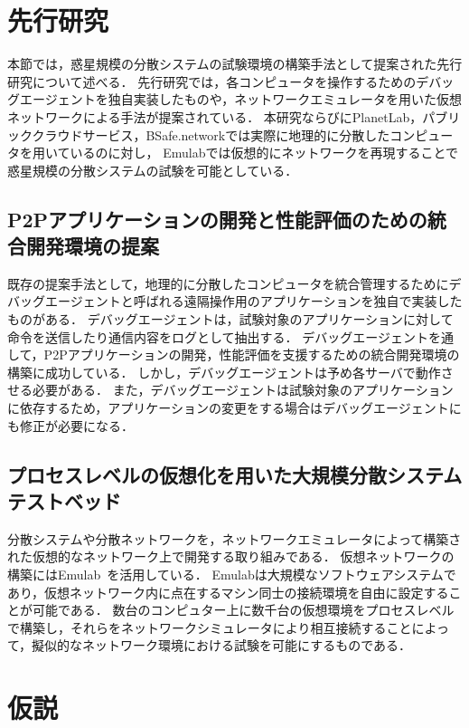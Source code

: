 \section{先行研究}
\label{issue:previous-research}

本節では，惑星規模の分散システムの試験環境の構築手法として提案された先行研究について述べる．
先行研究では，各コンピュータを操作するためのデバッグエージェントを独自実装したものや，ネットワークエミュレータを用いた仮想ネットワークによる手法が提案されている．
本研究ならびにPlanetLab，パブリッククラウドサービス，BSafe.networkでは実際に地理的に分散したコンピュータを用いているのに対し，
Emulabでは仮想的にネットワークを再現することで惑星規模の分散システムの試験を可能としている．

\subsection{P2Pアプリケーションの開発と性能評価のための統合開発環境の提案}

既存の提案手法として，地理的に分散したコンピュータを統合管理するためにデバッグエージェントと呼ばれる遠隔操作用のアプリケーションを独自で実装したものがある．
デバッグエージェントは，試験対象のアプリケーションに対して命令を送信したり通信内容をログとして抽出する．
デバッグエージェントを通して，P2Pアプリケーションの開発，性能評価を支援するための統合開発環境の構築に成功している．
しかし，デバッグエージェントは予め各サーバで動作させる必要がある．
また，デバッグエージェントは試験対象のアプリケーションに依存するため，アプリケーションの変更をする場合はデバッグエージェントにも修正が必要になる．

\subsection{プロセスレベルの仮想化を用いた大規模分散システムテストベッド}
\label{consideration:related-works:emulab}

分散システムや分散ネットワークを，ネットワークエミュレータによって構築された仮想的なネットワーク上で開発する取り組みである．
仮想ネットワークの構築にはEmulab~\cite{Emulab}を活用している．
Emulabは大規模なソフトウェアシステムであり，仮想ネットワーク内に点在するマシン同士の接続環境を自由に設定することが可能である．
数台のコンピュター上に数千台の仮想環境をプロセスレベルで構築し，それらをネットワークシミュレータにより相互接続することによって，擬似的なネットワーク環境における試験を可能にするものである．

\section{仮説}
\label{issue:hypothesis}

